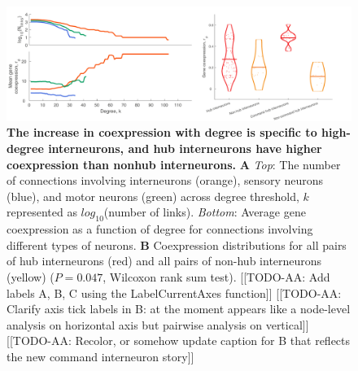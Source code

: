 \documentclass[10pt,letterpaper]{article}
\begin{document}
\begin{figure}[h]
\centering
   \includegraphics[width=1\textwidth]{interneurons.pdf}
 \caption{
\textbf{The increase in coexpression with degree is specific to high-degree interneurons, and hub interneurons have higher coexpression than nonhub interneurons.}
\textbf{A} \emph{Top}: The number of connections involving interneurons (orange), sensory neurons (blue), and motor neurons (green) across degree threshold, $k$ represented as $log_{10}$(number of links).
\emph{Bottom}: Average gene coexpression as a function of degree for connections involving different types of neurons.
\textbf{B} Coexpression distributions for all pairs of hub interneurons (red) and all pairs of non-hub interneurons (yellow) ($P = 0.047$, Wilcoxon rank sum test).
[[TODO-AA: Add labels A, B, C using the LabelCurrentAxes function]]
[[TODO-AA: Clarify axis tick labels in B: at the moment appears like a node-level analysis on horizontal axis but pairwise analysis on vertical]]
[[TODO-AA: Recolor, or somehow update caption for B that reflects the new command interneuron story]]
}
 \label{fig:interneuron_dep}
\end{figure}

\end{document}
